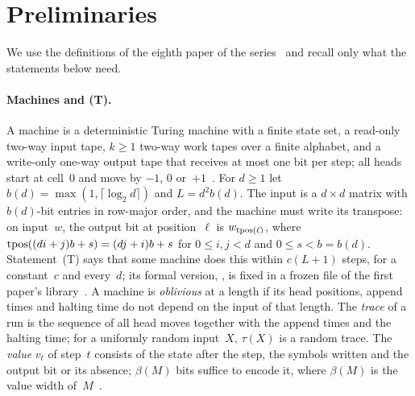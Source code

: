 \section{Preliminaries}\label{sec:prelim}

We use the definitions of the eighth paper of the series~\cite[Section~2]{BoundedNesting2026} and recall only what the
statements below need.

\paragraph{Machines and (T).} A machine is a deterministic Turing machine with a finite state set, a read-only two-way
input tape, $k\ge1$ two-way work tapes over a finite alphabet, and a write-only one-way output tape that receives at most
one bit per step; all heads start at cell~$0$ and move by $-1$, $0$ or~$+1$~\cite[Section~2.1]{BoundedNesting2026}. For
$d\ge1$ let $b(d)=\max(1,\lceil\log_2d\rceil)$ and $L=d^2b(d)$. The input is a $d\times d$ matrix with $b(d)$-bit entries
in row-major order, and the machine must write its transpose: on input~$w$, the output bit at position~$\ell$ is
$w_{\operatorname{tpos}(\ell)}$, where $\operatorname{tpos}((di+j)b+s)=(dj+i)b+s$ for $0\le i,j<d$ and $0\le s<b=b(d)$. Statement~(T) says that some
machine does this within $c(L+1)$ steps, for a constant~$c$ and every~$d$; its formal version,
, is fixed in a frozen file of the first paper's library~\cite{FirstPaper2026}. A
machine is \emph{oblivious} at a length if its head positions, append times and halting time do not depend on the input
of that length. The \emph{trace} of a run is the sequence of all head moves together with the append times and the
halting time; for a uniformly random input~$X$, $\tau(X)$ is a random trace. The \emph{value} $v_t$ of step~$t$ consists
of the state after the step, the symbols written and the output bit or its absence; $\beta(M)$ bits suffice to encode
it, where $\beta(M)$ is the value width of~$M$~\cite[Section~4.1]{FourthPaper2026}.

